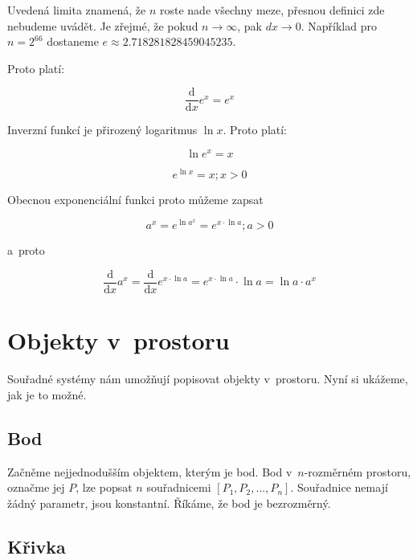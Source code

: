 Uvedená limita znamená, že \(n\) roste nade všechny meze, přesnou definici zde nebudeme uvádět. Je zřejmé, že pokud \(n \to \infty\), pak \(dx \to 0\). Například pro \(n = 2^{66}\) dostaneme \(e \approx 2.718281828459045235\).

Proto platí:

\begin{equation}
\frac{\mathrm{d}}{\mathrm{d}x} e^x = e^x
\end{equation}

Inverzní funkcí je přirozený logaritmus \(\ln x\). Proto platí:

\begin{equation}
\ln e^x = x
\end{equation}

\begin{equation}
e^{\ln x} = x; x > 0
\end{equation}

Obecnou exponenciální funkci proto můžeme zapsat

\begin{equation}
a^x = e^{\ln a^x} = e^{x \cdot \ln a}; a > 0
\end{equation}

a~proto

\begin{equation}
\frac{\mathrm{d}}{\mathrm{d}x} a^x = \frac{\mathrm{d}}{\mathrm{d}x} e^{x \cdot \ln a} = e^{x \cdot \ln a} \cdot \ln a = \ln a \cdot a^x
\end{equation}


\section{Objekty v~prostoru}

Souřadné systémy nám umožňují popisovat objekty v~prostoru. Nyní si ukážeme, jak je to možné.

\subsection{Bod}

Začněme nejjednodušším objektem, kterým je bod. Bod v~\(n\)-rozměrném prostoru, označme jej \(P\), lze popsat \(n\) souřadnicemi \([P_1, P_2, ..., P_n]\). Souřadnice nemají žádný parametr, jsou konstantní. Říkáme, že bod je bezrozměrný.

\subsection{Křivka}

